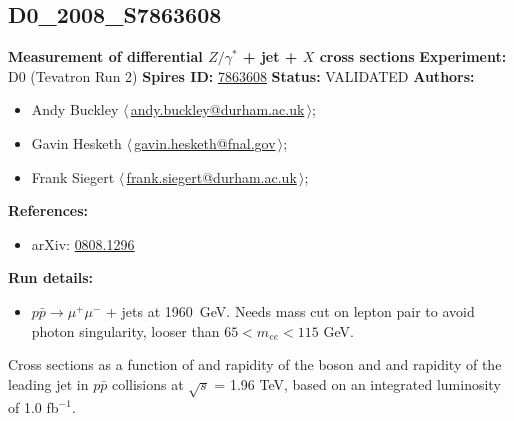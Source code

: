 \clearpage


\clearpage

\subsection[D0\_2008\_S7863608]{D0\_2008\_S7863608\,\cite{Abazov:2008ez}}
\textbf{Measurement of differential $Z/\gamma^*$ + jet + $X$ cross sections}\newline
\textbf{Experiment:} D0 (Tevatron Run 2) \newline
\textbf{Spires ID:} \href{http://www.slac.stanford.edu/spires/find/hep/www?rawcmd=key+7863608}{7863608}\newline
\textbf{Status:} VALIDATED\newline
\textbf{Authors:}
\begin{itemize}
  \item Andy Buckley $\langle\,$\href{mailto:andy.buckley@durham.ac.uk}{andy.buckley@durham.ac.uk}$\,\rangle$;
  \item Gavin Hesketh $\langle\,$\href{mailto:gavin.hesketh@fnal.gov}{gavin.hesketh@fnal.gov}$\,\rangle$;
  \item Frank Siegert $\langle\,$\href{mailto:frank.siegert@durham.ac.uk}{frank.siegert@durham.ac.uk}$\,\rangle$;
\end{itemize}
\textbf{References:}
\begin{itemize}
  \item arXiv: \href{http://arxiv.org/abs/0808.1296}{0808.1296}
\end{itemize}
\textbf{Run details:}
\begin{itemize}

  \item $p \bar{p} \to \mu^+ \mu^-$ + jets at 1960~GeV. Needs mass cut on lepton pair to avoid photon singularity, looser than $65 < m_{ee} < 115$ GeV.\end{itemize}

\noindent Cross sections as a function of \pT and rapidity of the boson and \pT and rapidity of the leading jet in $p \bar{p}$ collisions at $\sqrt{s}$ = 1.96 TeV, based on an integrated luminosity of 1.0 fb$^{-1}$.

\clearpage


\clearpage

